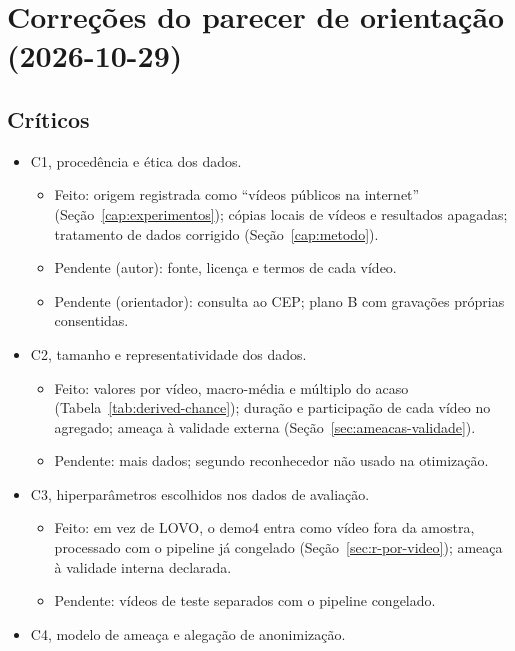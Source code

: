 \chapter{Correções do parecer de orientação (2026-10-29)}
\label{ap:parecer}


\section{Críticos}
\begin{itemize}
\item C1, procedência e ética dos dados.
  \begin{itemize}
  \item Feito: origem registrada como ``vídeos públicos na internet'' (Seção~\ref{cap:experimentos}); cópias locais de vídeos e resultados apagadas; tratamento de dados corrigido (Seção~\ref{cap:metodo}).
  \item Pendente (autor): fonte, licença e termos de cada vídeo.
  \item Pendente (orientador): consulta ao CEP; plano B com gravações próprias consentidas.
  \end{itemize}
\item C2, tamanho e representatividade dos dados.
  \begin{itemize}
  \item Feito: valores por vídeo, macro-média e múltiplo do acaso (Tabela~\ref{tab:derived-chance}); duração e participação de cada vídeo no agregado; ameaça à validade externa (Seção~\ref{sec:ameacas-validade}).
  \item Pendente: mais dados; segundo reconhecedor não usado na otimização.
  \end{itemize}
\item C3, hiperparâmetros escolhidos nos dados de avaliação.
  \begin{itemize}
  \item Feito: em vez de LOVO, o demo4 entra como vídeo fora da amostra, processado com o pipeline já congelado (Seção~\ref{sec:r-por-video}); ameaça à validade interna declarada.
  \item Pendente: vídeos de teste separados com o pipeline congelado.
  \end{itemize}
\item C4, modelo de ameaça e alegação de anonimização.

\end{itemize}
